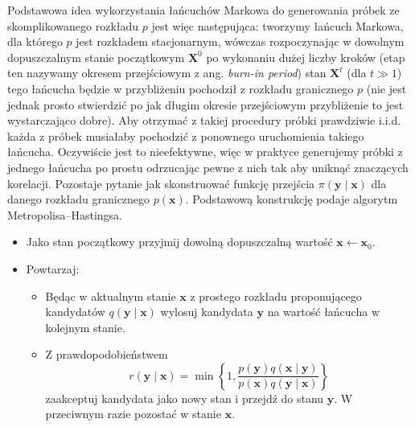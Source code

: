 \documentclass{myclass}
\numberwithin{equation}{subsection}
\begin{document}
Podstawowa idea wykorzystania łańcuchów Markowa do generowania próbek ze skomplikowanego rozkładu
\(p\) jest więc następująca: tworzymy łańcuch Markowa, dla którego \(p\) jest rozkładem
stacjonarnym, wówczas rozpoczynając w dowolnym dopuszczalnym stanie początkowym \(\mathbf{X}^0\) po
wykonaniu dużej liczby kroków (etap ten nazywamy okresem przejściowym z ang. \textit{burn-in
period}) stan \(\mathbf{X}^t\) (dla \(t \gg 1\)) tego łańcucha będzie w przybliżeniu pochodził z
rozkładu granicznego \(p\) (nie jest jednak prosto stwierdzić po jak długim okresie przejściowym
przybliżenie to jest wystarczająco dobre). Aby otrzymać z takiej procedury próbki prawdziwie i.i.d.
każda z próbek musiałaby pochodzić z ponownego uruchomienia takiego łańcucha. Oczywiście jest to
nieefektywne, więc w praktyce generujemy próbki z jednego łańcucha po prostu odrzucając pewne z nich
tak aby uniknąć znaczących korelacji. Pozostaje pytanie jak skonstruować funkcję przejścia
\(\pi(\mathbf{y} \mid \mathbf{x})\) dla danego rozkładu granicznego \(p(\mathbf{x})\). Podstawową
konstrukcję podaje algorytm Metropolisa--Hastingsa.
\begin{tcolorbox}[title=Algorytm Metropolisa--Hastingsa]
\begin{itemize}
    \item Jako stan początkowy przyjmij dowolną dopuszczalną wartość \(\mathbf{x} \leftarrow
    \mathbf{x}_0\).
    \item Powtarzaj:
    \begin{itemize}
        \item Będąc w aktualnym stanie \(\mathbf{x}\) z prostego rozkładu proponującego kandydatów
        \(q(\mathbf{y} \mid \mathbf{x})\) wylosuj kandydata \(\mathbf{y}\) na wartość łańcucha w
        kolejnym stanie.
        \item Z prawdopodobieństwem
        \begin{equation*}
            r(\mathbf{y} \mid \mathbf{x}) = \min\left\{1, \frac{p(\mathbf{y})q(\mathbf{x} \mid \mathbf{y})}{p(\mathbf{x})q(\mathbf{y} \mid \mathbf{x})}\right\}
        \end{equation*}
        zaakceptuj kandydata jako nowy stan i przejdź do stanu \(\mathbf{y}\). W przeciwnym razie
        pozostać w stanie \(\mathbf{x}\).
    \end{itemize}
\end{itemize}
\end{tcolorbox}
\end{document}
